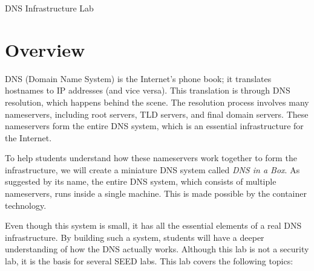 
\newcommand{\commonfolder}{../../common-files}




\newcommand{\dnsFigs}{./Figs}


\usepackage{hyperref}




\begin{center}
{\LARGE DNS Infrastructure Lab}
\end{center}




\section{Overview}

DNS (Domain Name System) is the Internet's phone book; it
translates hostnames to IP addresses (and vice versa).
This translation is through DNS resolution, which happens behind
the scene. The resolution process involves many nameservers,
including root servers, TLD servers, and final domain servers.
These nameservers form the entire DNS system, which is an
essential infrastructure for the Internet.

To help students understand how these nameservers work together
to form the infrastructure, we will create a miniature DNS system
called \textit{DNS in a Box}. As suggested by its name,
the entire DNS system, which consists of multiple
nameservers, runs inside a single machine. This is made
possible by the container technology.


Even though this system is small, it has all the essential
elements of a real DNS infrastructure. By building such a system,
students will have a deeper understanding of how the DNS actually works.
Although this lab is not a security lab, it is the basis for
several SEED labs. This lab covers the following topics:

